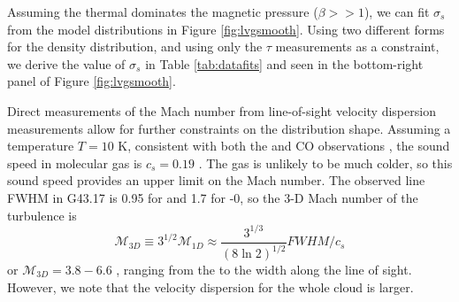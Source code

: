 


Assuming the thermal dominates the magnetic pressure ($\beta>>1$), we can fit
$\sigma_s$ from the model distributions in Figure \ref{fig:lvgsmooth}.  Using two
different forms for the density distribution, and using only the $\tau$
measurements as a constraint, we derive the value of $\sigma_s$ in Table
\ref{tab:datafits} and seen in the bottom-right panel of Figure \ref{fig:lvgsmooth}.

Direct measurements of the Mach number from line-of-sight velocity dispersion
measurements allow for further constraints on the distribution shape.  Assuming
a temperature $T=10$ K, consistent with both the \formaldehyde and CO
observations \citep{Plume2004a}, the sound speed in molecular gas is $c_s=0.19$
\kms.  The gas is unlikely to be much colder, so this sound speed provides an
upper limit on the Mach number.  The observed line FWHM in G43.17 is 0.95 \kms
for \formaldehyde and 1.7 \kms for -0,
so the 3-D Mach number of the turbulence is \citep{Schneider2013a}
\begin{equation}
    \label{eqn:mach}
    \mathcal{M}_{3D} \equiv 3^{1/2} \mathcal{M}_{1D} \approx \frac{3^{1/3}}{(8\ln 2)^{1/2}} FWHM / c_s 
\end{equation}
or $\mathcal{M}_{3D} = 3.8 - 6.6 $ , ranging from the \formaldehyde to the \thirteenco width along
the \north line of sight.  However, we note that the velocity dispersion for the whole cloud is
larger.

